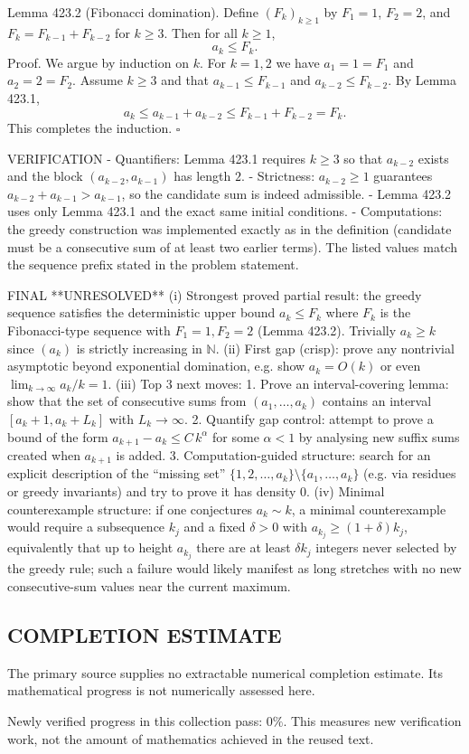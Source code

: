 Lemma 423.2 (Fibonacci domination).
Define $(F_k)_{k\ge 1}$ by $F_1=1$, $F_2=2$, and $F_k=F_{k-1}+F_{k-2}$ for $k\ge 3$.
Then for all $k\ge 1$,
\[
 a_k\le F_k.
\]
Proof.
We argue by induction on $k$.
For $k=1,2$ we have $a_1=1=F_1$ and $a_2=2=F_2$.
Assume $k\ge 3$ and that $a_{k-1}\le F_{k-1}$ and $a_{k-2}\le F_{k-2}$. By Lemma 423.1,
\[
 a_k\le a_{k-1}+a_{k-2}\le F_{k-1}+F_{k-2}=F_k.
\]
This completes the induction.
\hfill $\square$

VERIFICATION
- Quantifiers: Lemma 423.1 requires $k\ge 3$ so that $a_{k-2}$ exists and the block $(a_{k-2},a_{k-1})$ has length $2$.
- Strictness: $a_{k-2}\ge 1$ guarantees $a_{k-2}+a_{k-1}>a_{k-1}$, so the candidate sum is indeed admissible.
- Lemma 423.2 uses only Lemma 423.1 and the exact same initial conditions.
- Computations: the greedy construction was implemented exactly as in the definition (candidate must be a consecutive sum of at least two earlier terms). The listed values match the sequence prefix stated in the problem statement.

FINAL
**UNRESOLVED**
(i) Strongest proved partial result: the greedy sequence satisfies the deterministic upper bound $a_k\le F_k$ where $F_k$ is the Fibonacci-type sequence with $F_1=1,F_2=2$ (Lemma 423.2). Trivially $a_k\ge k$ since $(a_k)$ is strictly increasing in $\mathbb N$.
(ii) First gap (crisp): prove any nontrivial asymptotic beyond exponential domination, e.g. show $a_k=O(k)$ or even $\lim_{k\to\infty}a_k/k=1$.
(iii) Top 3 next moves:
  1. Prove an interval-covering lemma: show that the set of consecutive sums from $(a_1,\dots,a_k)$ contains an interval $[a_k+1,a_k+L_k]$ with $L_k\to\infty$.
  2. Quantify gap control: attempt to prove a bound of the form $a_{k+1}-a_k\le C\,k^\alpha$ for some $\alpha<1$ by analysing new suffix sums created when $a_{k+1}$ is added.
  3. Computation-guided structure: search for an explicit description of the “missing set” $\{1,2,\dots,a_k\}\setminus\{a_1,\dots,a_k\}$ (e.g. via residues or greedy invariants) and try to prove it has density $0$.
(iv) Minimal counterexample structure: if one conjectures $a_k\sim k$, a minimal counterexample would require a subsequence $k_j$ and a fixed $\delta>0$ with $a_{k_j}\ge (1+\delta)k_j$, equivalently that up to height $a_{k_j}$ there are at least $\delta k_j$ integers never selected by the greedy rule; such a failure would likely manifest as long stretches with no new consecutive-sum values near the current maximum.




\subsection*{COMPLETION ESTIMATE}
The primary source supplies no extractable numerical completion estimate. Its mathematical progress is not numerically assessed here.

Newly verified progress in this collection pass: $0\%$. This measures new verification work, not the amount of mathematics achieved in the reused text.
